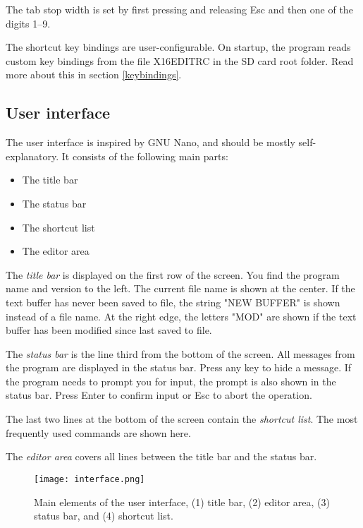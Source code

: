 \documentclass{article}
\begin{document}
        \noindent The tab stop width is set by first pressing and releasing Esc and then one of the digits 1--9.

        The shortcut key bindings are user-configurable. On startup, the program reads custom key bindings from the file
        X16EDITRC in the SD card root folder. Read more about this in section \ref{keybindings}.

    \subsection{User interface}
	
	The user interface is inspired by GNU Nano, and should be mostly self-explanatory. It consists of the following main parts:
	
	\begin{itemize}
		\item The title bar
		\item The status bar
		\item The shortcut list
		\item The editor area
	\end{itemize}
	
	\noindent The \textit{title bar} is displayed on the first row of the screen. You find the program name and version to the left. 
	The current file name is shown at the center. If the text buffer has never been saved to file, the string "NEW BUFFER" is
	shown instead of a file name. At the right edge, the letters "MOD" are shown if the text buffer has been modified
	since last saved to file.
	
	The \textit{status bar} is the line third from the bottom of the screen. All messages from the program are displayed in
	the status bar. Press any key to hide a message. If the program needs to prompt you for input, the prompt is also shown in the status bar. 
	Press Enter to confirm input or Esc to abort the operation.
	
	The last two lines at the bottom of the screen contain the \textit{shortcut list}. The most frequently used commands are
	shown here.
	
	The \textit{editor area} covers all lines between the title bar and the status bar. 

    \begin{figure}[H]
        \caption{Main elements of the user interface, (1) title bar, (2) editor area, (3) status bar, and (4) shortcut list.}
        \centering\texttt{[image: interface.png]}
    \end{figure}
	
\end{document}
